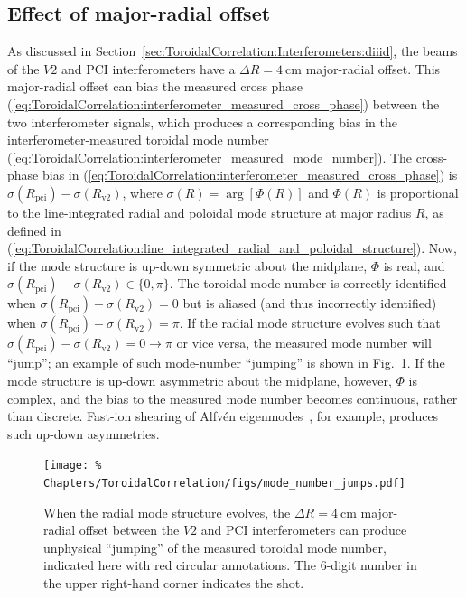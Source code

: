 \subsection{Effect of major-radial offset}
\label{sec:ToroidalCorrelation:ImplementationDetails:radial_offset}
As discussed in Section~\ref{sec:ToroidalCorrelation:Interferometers:diiid},
the beams of the $V2$ and PCI interferometers have a
$\Delta R = \SI{4}{\centi\meter}$ major-radial offset.
This major-radial offset can bias the measured cross phase
(\ref{eq:ToroidalCorrelation:interferometer_measured_cross_phase})
between the two interferometer signals,
which produces a corresponding bias
in the interferometer-measured toroidal mode number
(\ref{eq:ToroidalCorrelation:interferometer_measured_mode_number}).
The cross-phase bias in
(\ref{eq:ToroidalCorrelation:interferometer_measured_cross_phase})
is $\sigma(R_{\text{pci}}) - \sigma(R_{\text{v2}})$, where
$\sigma(R) = \arg[\Phi(R)]$ and $\Phi(R)$ is proportional to
the line-integrated radial and poloidal mode structure
at major radius $R$, as defined in
(\ref{eq:ToroidalCorrelation:line_integrated_radial_and_poloidal_structure}).
Now, if the mode structure is up-down symmetric about the midplane,
$\Phi$ is real, and
$\sigma(R_{\text{pci}}) - \sigma(R_{\text{v2}}) \in \{0, \pi\}$.
The toroidal mode number is correctly identified
when $\sigma(R_{\text{pci}}) - \sigma(R_{\text{v2}}) = 0$ but
is aliased (and thus incorrectly identified)
when $\sigma(R_{\text{pci}}) - \sigma(R_{\text{v2}}) = \pi$.
If the radial mode structure evolves such that
$\sigma(R_{\text{pci}}) - \sigma(R_{\text{v2}}) = 0 \rightarrow \pi$
or vice versa,
the measured mode number will ``jump'';
an example of such mode-number ``jumping'' is shown in
Fig.~\ref{fig:ToroidalCorrelation:mode_number_jumps}.
If the mode structure is up-down asymmetric about the midplane, however,
$\Phi$ is complex, and
the bias to the measured mode number becomes continuous, rather than discrete.
Fast-ion shearing of Alfv\'{e}n eigenmodes~\cite{tobias_prl11},
for example, produces such up-down asymmetries.

\begin{figure}
  \centering
  \texttt{[image: \%
    Chapters/ToroidalCorrelation/figs/mode\_number\_jumps.pdf]}
  \caption[Mode-number ``jumping'' due to major-radial offset of interferometers]{%
    When the radial mode structure evolves,
    the $\Delta R = \SI{4}{\centi\meter}$ major-radial offset
    between the $V2$ and PCI interferometers can produce
    unphysical ``jumping'' of the measured toroidal mode number,
    indicated here with red circular annotations.
    The $6$-digit number in the upper right-hand corner
    indicates the \diiid\space shot.
  }
\label{fig:ToroidalCorrelation:mode_number_jumps}
\end{figure}

